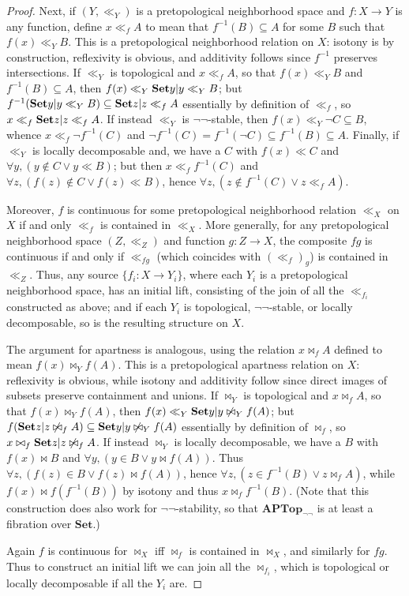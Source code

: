 \documentclass{article}
\def\cpl#1{\neg #1}
\def\inv{^{-1}}
\def\nn{\ensuremath{\neg\neg}}
\def\Set{\mathbf{Set}}
\def\APTopnn{\mathbf{APTop}_{\nn}}
\begin{document}
\begin{proof}
  Next, if $(Y,\ll_Y)$ is a pretopological neighborhood space and $f:X\to Y$ is any function, define $x\ll_f A$ to mean that $f\inv(B)\subseteq A$ for some $B$ such that $f(x)\ll_Y B$.
  This is a pretopological neighborhood relation on $X$: isotony is by construction, reflexivity is obvious, and additivity follows since $f\inv$ preserves intersections.
  If $\ll_Y$ is topological and $x\ll_f A$, so that $f(x)\ll_Y B$ and $f\inv(B)\subseteq A$, then $f(x)\ll_Y \setof{y|y\ll_Y B}$; but $f\inv(\setof{y|y\ll_Y B}) \subseteq \setof{z|z\ll_f A}$ essentially by definition of $\ll_f$, so $x \ll_f \setof{z|z\ll_f A}$.
  If instead $\ll_Y$ is \nn-stable, then $f(x)\ll_Y \cpl{C} \subseteq B$, whence $x \ll_f \cpl{f\inv(C)}$ and $\cpl{f\inv(C)} = f\inv(\cpl{C}) \subseteq f\inv(B) \subseteq A$.
  Finally, if $\ll_Y$ is locally decomposable and, we have a $C$ with $f(x)\ll C$ and $\forall y, (y\notin C \lor y\ll B)$; but then $x\ll_f f\inv(C)$ and $\forall z, (f(z)\notin C \lor f(z) \ll B)$, hence $\forall z, (z\notin f\inv(C) \lor z \ll_f A)$.

  Moreover, $f$ is continuous for some pretopological neighborhood relation $\ll_X$ on $X$ if and only $\ll_f$ is contained in $\ll_X$.
  More generally, for any pretopological neighborhood space $(Z,\ll_Z)$ and function $g:Z\to X$, the composite $f g$ is continuous if and only if $\ll_{f g}$ (which coincides with $(\ll_f)_g$) is contained in $\ll_Z$.
  Thus, any source $\{ f_i : X \to Y_i \}$, where each $Y_i$ is a pretopological neighborhood space, has an initial lift, consisting of the join of all the $\ll_{f_i}$ constructed as above; and if each $Y_i$ is topological, \nn-stable, or locally decomposable, so is the resulting structure on $X$.

  The argument for apartness is analogous, using the relation $x\bowtie_f A$ defined to mean $f(x)\bowtie_Y f(A)$.
  This is a pretopological apartness relation on $X$: reflexivity is obvious, while isotony and additivity follow since direct images of subsets preserve containment and unions.
  If $\bowtie_Y$ is topological and $x\bowtie_f A$, so that $f(x)\bowtie_Y f(A)$, then $f(x) \ll_Y \setof{y|y\not\bowtie_Y f(A)}$; but $f(\setof{z|z\not\bowtie_f A}) \subseteq \setof{y|y\not\bowtie_Y f(A)}$ essentially by definition of $\bowtie_f$, so $x\bowtie_f \setof{z|z\not\bowtie_f A}$.
  If instead $\bowtie_Y$ is locally decomposable, we have a $B$ with $f(x)\bowtie B$ and $\forall y,(y\in B \lor y\bowtie f(A))$.
  Thus $\forall z, (f(z)\in B \lor f(z)\bowtie f(A))$, hence $\forall z, (z\in f\inv(B) \lor z\bowtie_f A)$, while $f(x) \bowtie f(f\inv(B))$ by isotony and thus $x \bowtie_f f\inv(B)$.
  (Note that this construction does also work for \nn-stability, so that $\APTopnn$ is at least a fibration over $\Set$.)

  Again $f$ is continuous for $\bowtie_X$ iff $\bowtie_f$ is contained in $\bowtie_X$, and similarly for $f g$.
  Thus to construct an initial lift we can join all the $\bowtie_{f_i}$, which is topological or locally decomposable if all the $Y_i$ are.
\end{proof}
\end{document}

